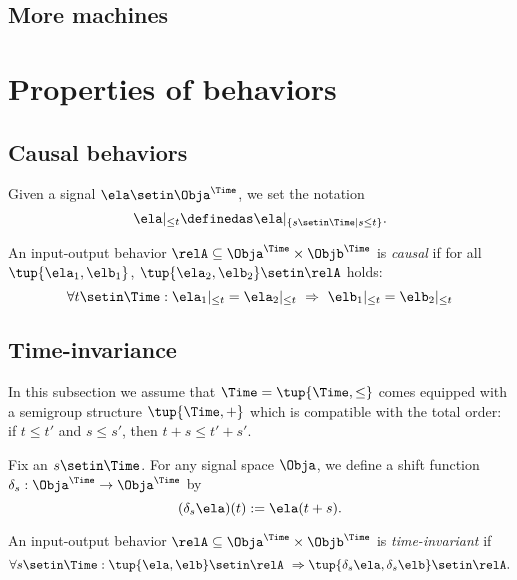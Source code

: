 \subsection{More machines}

\section{Properties of behaviors}

\subsection{Causal behaviors}

Given a signal $\ela \setin \Obja^\Time$, we set the notation
\begin{equation}
    \ela \vert_{\leq t} \definedas  \ela \vert_{\{ s \setin \Time \mid s \leq t\}}.
\end{equation}

\begin{definition}
    An input-output behavior $\relA \subseteq \Obja^\Time \times \Objb^\Time$ is \emph{causal} if for all~$\tup{\ela_1, \elb_1}$, $\tup{\ela_2, \elb_2} \setin \relA$ holds:
    \begin{equation}
        \forall t \setin \Time: \ela_1 \vert_{ \leq t} = \ela_2 \vert_{ \leq t} \  \Rightarrow \ \elb_1 \vert_{ \leq t} = \elb_2 \vert_{ \leq t}
    \end{equation}
\end{definition}


\subsection{Time-invariance}

In this subsection we assume that $\Time = \tup{\Time, \leq}$ comes equipped with a semigroup structure $\tup{\Time, +}$ which is compatible with the total order: if $t \leq t'$ and $s \leq s'$, then $t + s \leq t' + s'$.

Fix an $s \setin \Time$.
For any signal space $\Obja$, we define a shift function $\delta_s: \Obja^\Time \to \Obja^\Time$ by
\begin{equation}
    (\delta_s \ela)(t) := \ela(t + s).
\end{equation}

\begin{definition}
    An input-output behavior $\relA \subseteq \Obja^\Time \times \Objb^\Time$ is \emph{time-invariant} if
    \begin{equation}
        \forall s \setin \Time: \tup{\ela, \elb} \setin \relA  \ \Rightarrow \tup{\delta_s \ela, \delta_s \elb} \setin \relA.
    \end{equation}
\end{definition}



